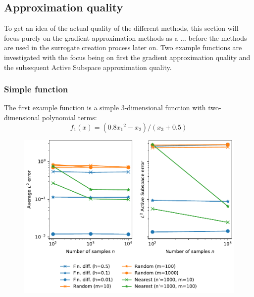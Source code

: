 \documentclass[
  a4paper,  %
  twoside,  %
  bibliography=totoc,
  headsepline,
  cleardoublepage=empty,
  parskip=half,
  draft=false
]{scrbook}
\begin{document}
\subsection{Approximation quality}

To get an idea of the actual quality of the different methods, this section will focus purely on the gradient approximation methods as a ... before the methods are used in the surrogate creation process later on.
Two example functions are investigated with the focus being on first the gradient approximation quality and the subsequent Active Subspace approximation quality.

\newpage

\subsubsection{Simple function}

The first example function is a simple $3$-dimensional function with two-dimensional polynomial terms:
\begin{equation}
f_1(x)=(0.8 {x_1}^2 - x_2) / (x_3 + 0.5)
\nonumber
\end{equation}



\begin{figure}[H]
\begin{center}
	\includegraphics[width=\textwidth]{graphics/as_errors_f1}
\end{center}
	\label{fig:as_errors_f1}
\end{figure}
\end{document}
